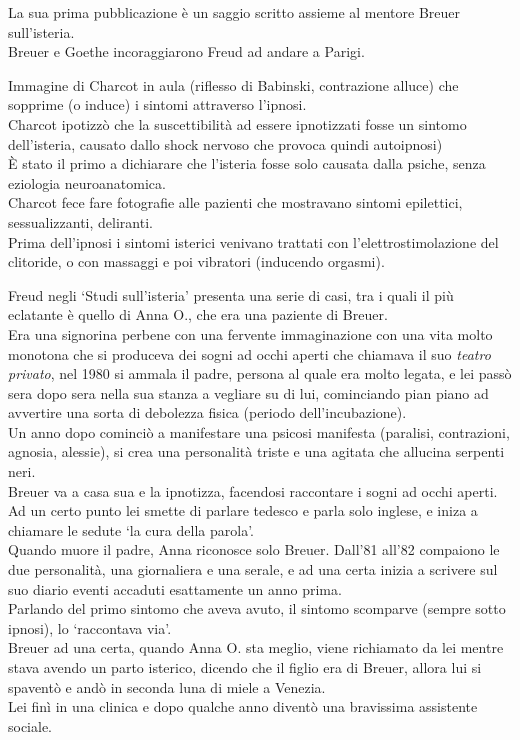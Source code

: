 \documentclass[
]{article}
\begin{document}
La sua prima pubblicazione è un saggio scritto assieme al mentore Breuer
sull'isteria.\\
Breuer e Goethe incoraggiarono Freud ad andare a Parigi.

Immagine di Charcot in aula (riflesso di Babinski, contrazione alluce)
che sopprime (o induce) i sintomi attraverso l'ipnosi.\\
Charcot ipotizzò che la suscettibilità ad essere ipnotizzati fosse un
sintomo dell'isteria, causato dallo shock nervoso che provoca quindi
autoipnosi)\\
È stato il primo a dichiarare che l'isteria fosse solo causata dalla
psiche, senza eziologia neuroanatomica.\\
Charcot fece fare fotografie alle pazienti che mostravano sintomi
epilettici, sessualizzanti, deliranti.\\
Prima dell'ipnosi i sintomi isterici venivano trattati con
l'elettrostimolazione del clitoride, o con massaggi e poi vibratori
(inducendo orgasmi).

Freud negli `Studi sull'isteria' presenta una serie di casi, tra i quali
il più eclatante è quello di Anna O., che era una paziente di Breuer.\\
Era una signorina perbene con una fervente immaginazione con una vita
molto monotona che si produceva dei sogni ad occhi aperti che chiamava
il suo \emph{teatro privato}, nel 1980 si ammala il padre, persona al
quale era molto legata, e lei passò sera dopo sera nella sua stanza a
vegliare su di lui, cominciando pian piano ad avvertire una sorta di
debolezza fisica (periodo dell'incubazione).\\
Un anno dopo cominciò a manifestare una psicosi manifesta (paralisi,
contrazioni, agnosia, alessie), si crea una personalità triste e una
agitata che allucina serpenti neri.\\
Breuer va a casa sua e la ipnotizza, facendosi raccontare i sogni ad
occhi aperti. Ad un certo punto lei smette di parlare tedesco e parla
solo inglese, e iniza a chiamare le sedute `la cura della parola'.\\
Quando muore il padre, Anna riconosce solo Breuer. Dall'81 all'82
compaiono le due personalità, una giornaliera e una serale, e ad una
certa inizia a scrivere sul suo diario eventi accaduti esattamente un
anno prima.\\
Parlando del primo sintomo che aveva avuto, il sintomo scomparve (sempre
sotto ipnosi), lo `raccontava via'.\\
Breuer ad una certa, quando Anna O. sta meglio, viene richiamato da lei
mentre stava avendo un parto isterico, dicendo che il figlio era di
Breuer, allora lui si spaventò e andò in seconda luna di miele a
Venezia.\\
Lei finì in una clinica e dopo qualche anno diventò una bravissima
assistente sociale.
\end{document}
